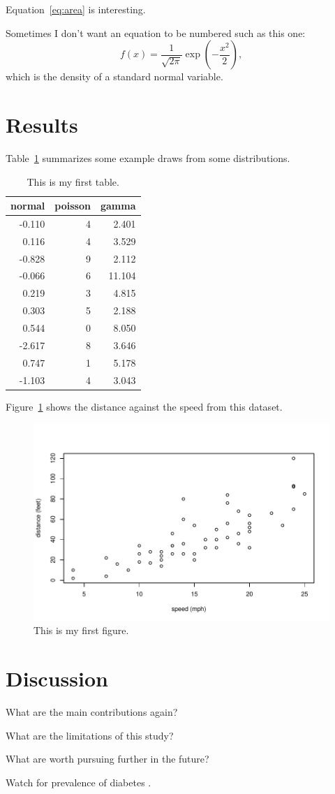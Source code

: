 \documentclass[12pt, titlepage]{article}
\begin{document}
Equation~\eqref{eq:area} is interesting. \lipsum[1-4]

Sometimes I don't want an equation to be numbered such as this one:
\[
  f(x) = \frac{1}{\sqrt{2\pi}} \exp\left( - \frac{x^2}{2} \right),
\]
which is the density of a standard normal variable.



\section{Results}
\label{sec:resu}

Table~\ref{tab:rv} summarizes some example draws from some distributions.
\lipsum[1-4]

\begin{table}[tbp]
  \caption{This is my first table.}
  \label{tab:rv}
\centering
\begin{tabular}{rrr}
  \toprule
normal & poisson & gamma \\ 
  \midrule
-0.110 & 4 & 2.401 \\ 
  0.116 & 4 & 3.529 \\ 
  -0.828 & 9 & 2.112 \\ 
  -0.066 & 6 & 11.104 \\ 
  0.219 & 3 & 4.815 \\ 
  0.303 & 5 & 2.188 \\ 
  0.544 & 0 & 8.050 \\ 
  -2.617 & 8 & 3.646 \\ 
  0.747 & 1 & 5.178 \\ 
  -1.103 & 4 & 3.043 \\ 
   \bottomrule
\end{tabular}
\end{table}

Figure~\ref{fig:cars} shows the distance against the speed from this dataset.


\begin{figure}[tbp]
  \centering
  \includegraphics[width=\textwidth]{cars.pdf}
  \caption{This is my first figure.}
  \label{fig:cars}
\end{figure}

\section{Discussion}
\label{sec:disc}

What are the main contributions again?

What are the limitations of this study?

What are worth pursuing further in the future?

\lipsum[1-2]
Watch for prevalence of diabetes \citep{wild2004global}.



\end{document}

